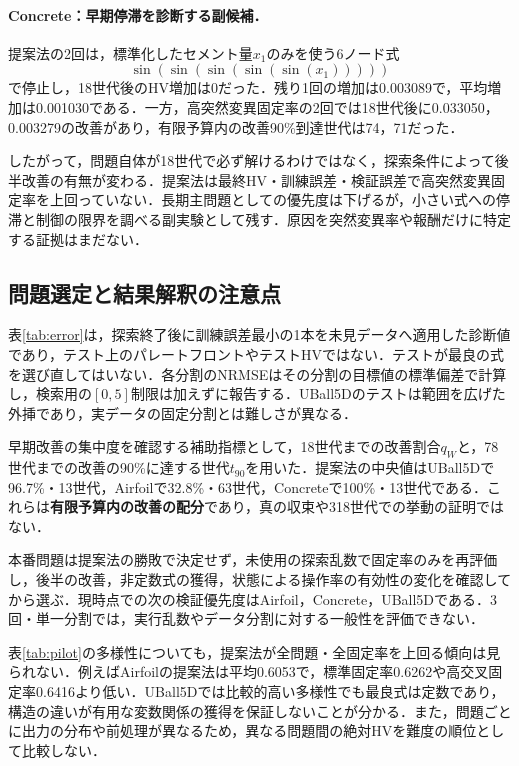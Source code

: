 \documentclass[a4paper,10pt,twocolumn]{ltjsarticle}
\begin{document}
\paragraph{Concrete：早期停滞を診断する副候補．}
提案法の2回は，標準化したセメント量\(x_1\)のみを使う6ノード式
\[\sin(\sin(\sin(\sin(\sin(x_1)))))\]
で停止し，18世代後のHV増加は0だった．残り1回の増加は0.003089で，平均増加は0.001030である．一方，高突然変異固定率の2回では18世代後に0.033050，0.003279の改善があり，有限予算内の改善90\%到達世代は74，71だった．

したがって，問題自体が18世代で必ず解けるわけではなく，探索条件によって後半改善の有無が変わる．提案法は最終HV・訓練誤差・検証誤差で高突然変異固定率を上回っていない．長期主問題としての優先度は下げるが，小さい式への停滞と制御の限界を調べる副実験として残す．原因を突然変異率や報酬だけに特定する証拠はまだない．

\begin{table}[tb]
\centering\small
\caption{訓練誤差最小の最終式のNRMSE（各3回，平均\(\pm\)標準偏差）}
\label{tab:error}

\end{table}

\subsection{問題選定と結果解釈の注意点}
表\ref{tab:error}は，探索終了後に訓練誤差最小の1本を未見データへ適用した診断値であり，テスト上のパレートフロントやテストHVではない．テストが最良の式を選び直してはいない．各分割のNRMSEはその分割の目標値の標準偏差で計算し，検索用の\([0,5]\)制限は加えずに報告する．UBall5Dのテストは範囲を広げた外挿であり，実データの固定分割とは難しさが異なる．

早期改善の集中度を確認する補助指標として，18世代までの改善割合\(q_W\)と，78世代までの改善の90\%に達する世代\(t_{90}\)を用いた．提案法の中央値はUBall5Dで96.7\%・13世代，Airfoilで32.8\%・63世代，Concreteで100\%・13世代である．これらは\textbf{有限予算内の改善の配分}であり，真の収束や318世代での挙動の証明ではない．

本番問題は提案法の勝敗で決定せず，未使用の探索乱数で固定率のみを再評価し，後半の改善，非定数式の獲得，状態による操作率の有効性の変化を確認してから選ぶ．現時点での次の検証優先度はAirfoil，Concrete，UBall5Dである．3回・単一分割では，実行乱数やデータ分割に対する一般性を評価できない．

表\ref{tab:pilot}の多様性についても，提案法が全問題・全固定率を上回る傾向は見られない．例えばAirfoilの提案法は平均0.6053で，標準固定率0.6262や高交叉固定率0.6416より低い．UBall5Dでは比較的高い多様性でも最良式は定数であり，構造の違いが有用な変数関係の獲得を保証しないことが分かる．また，問題ごとに出力の分布や前処理が異なるため，異なる問題間の絶対HVを難度の順位として比較しない．
\end{document}
